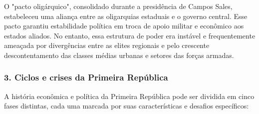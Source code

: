 \documentclass[a4paper,12pt]{article}[abntex2]
\begin{document}
O "pacto oligárquico", consolidado durante a presidência de Campos Sales, estabeleceu uma aliança entre as oligarquias estaduais e o governo central. Esse pacto garantiu estabilidade política em troca de apoio militar e econômico aos estados aliados. No entanto, essa estrutura de poder era instável e frequentemente ameaçada por divergências entre as elites regionais e pelo crescente descontentamento das classes médias urbanas e setores das forças armadas.

\subsubsection{\textbf{3. Ciclos e crises da Primeira República}}

A história econômica e política da Primeira República pode ser dividida em cinco fases distintas, cada uma marcada por suas características e desafios específicos:
\end{document}
